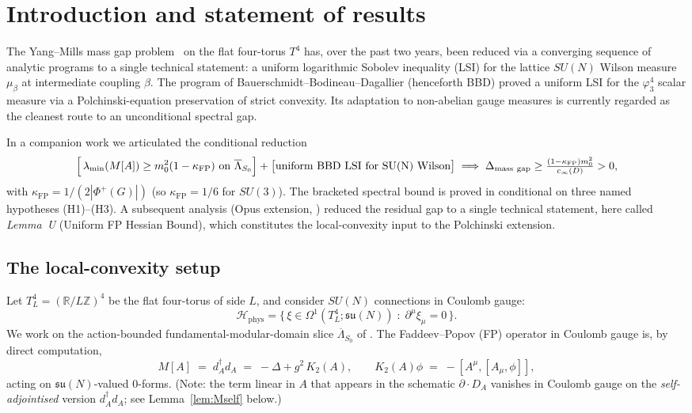 \documentclass[11pt,a4paper]{amsart}
\theoremstyle{definition}
\newcommand{\R}{\mathbb{R}}
\newcommand{\Z}{\mathbb{Z}}
\newcommand{\su}{\mathfrak{su}}
\newcommand{\kFP}{\kappa_{\mathrm{FP}}}
\begin{document}
\maketitle

\section{Introduction and statement of results}\label{sec:intro}

The Yang--Mills mass gap problem~\cite{JaffeWitten2000} on the flat
four-torus $T^4$ has, over the past two years, been reduced via a converging
sequence of analytic programs to a single technical statement: a uniform
logarithmic Sobolev inequality (LSI) for the lattice $SU(N)$ Wilson measure
$\mu_\beta$ at intermediate coupling $\beta$. The program of
Bauerschmidt--Bodineau--Dagallier (henceforth BBD)
\cite{BauerschmidtBodineauDagallier2024,BauerschmidtDagallier2024} proved a
uniform LSI for the $\varphi^4_3$ scalar measure via a Polchinski-equation
preservation of strict convexity. Its adaptation to non-abelian gauge measures
is currently regarded as the cleanest route to an unconditional spectral gap.

In a companion work \cite{RemondiereKRFPBakryEmery_2026} we articulated the
conditional reduction
\[
\Bigl[\,\lambda_{\min}(M[A]) \geq m_0^2(1-\kFP) \text{ on } \overline\Lambda_{S_0}\Bigr]
+ \bigl[\text{uniform BBD LSI for SU(N) Wilson}\bigr]
\;\Longrightarrow\;
\Delta_{\mathrm{mass\ gap}} \geq \tfrac{(1-\kFP)m_0^2}{c_\infty(D)} > 0,
\]
with $\kFP = 1/(2|\Phi^+(G)|)$ (so $\kFP = 1/6$ for $SU(3)$). The bracketed
spectral bound is proved in \cite{RemondiereKRFP3_2026} conditional on three
named hypotheses (H1)--(H3). A subsequent analysis (Opus extension,
\cite{OpusPolchinskiExtension_2026}) reduced the residual gap to a single
technical statement, here called \emph{Lemma~U} (Uniform FP Hessian Bound), which
constitutes the local-convexity input to the Polchinski extension.

\subsection{The local-convexity setup}

Let $T^4_L = (\R/L\Z)^4$ be the flat four-torus of side $L$, and consider
$SU(N)$ connections in Coulomb gauge:
\[
\mathcal H_{\mathrm{phys}}
= \bigl\{\,\xi \in \Omega^1(T^4_L; \su(N)) \;:\; \partial^\mu \xi_\mu = 0\,\bigr\}.
\]
We work on the action-bounded fundamental-modular-domain slice
$\overline\Lambda_{S_0}$ of \cite{Singer1978, DellAntonioZwanziger1991}. The
Faddeev--Popov (FP) operator in Coulomb gauge is, by direct computation,
\begin{equation}\label{eq:FP-Coulomb}
M[A] \;=\; d_A^\dagger d_A \;=\; -\Delta + g^2\,K_2(A),
\qquad
K_2(A)\phi \;=\; -[A^\mu, [A_\mu, \phi]],
\end{equation}
acting on $\su(N)$-valued $0$-forms. (Note: the term linear in $A$ that appears
in the schematic $\partial \cdot D_A$ vanishes in Coulomb gauge on the
\emph{self-adjointised} version $d_A^\dagger d_A$; see Lemma~\ref{lem:Mself} below.)
\end{document}
